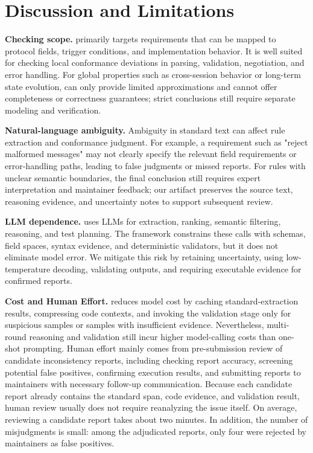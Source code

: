 \section{Discussion and Limitations}
\label{sec:discussion}

\noindent \textbf{Checking scope.}
\tool{} primarily targets requirements that can be mapped to protocol fields,
trigger conditions, and implementation behavior. It is well suited for checking
local conformance deviations in parsing, validation, negotiation, and error
handling. For global properties such as cross-session behavior or long-term
state evolution, \tool{} can only provide limited approximations and cannot
offer completeness or correctness guarantees; strict conclusions still require
separate modeling and verification.

\noindent \textbf{Natural-language ambiguity.}
Ambiguity in standard text can affect rule extraction and conformance
judgment. For example, a requirement such as "reject malformed messages" may
not clearly specify the relevant field requirements or error-handling paths,
leading to false judgments or missed reports. For rules with unclear semantic
boundaries, the final conclusion still requires expert interpretation and
maintainer feedback; our artifact preserves the source text, reasoning
evidence, and uncertainty notes to support subsequent review.

\noindent \textbf{LLM dependence.}
\tool{} uses LLMs for extraction, ranking, semantic filtering, reasoning, and
test planning. The framework constrains these calls with schemas, field spaces,
syntax evidence, and deterministic validators, but it does not eliminate model
error. We mitigate this risk by retaining uncertainty, using low-temperature
decoding, validating outputs, and requiring executable evidence for confirmed 
reports.

\noindent \textbf{Cost and Human Effort.}
\tool{} reduces model cost by caching standard-extraction results,
compressing code contexts, and invoking the validation stage only for
suspicious samples or samples with insufficient evidence. Nevertheless,
multi-round reasoning and validation still incur higher model-calling costs
than one-shot prompting. Human effort mainly comes from pre-submission review
of candidate inconsistency reports, including checking report accuracy,
screening potential false positives, confirming execution results, and
submitting reports to maintainers with necessary follow-up communication.
Because each candidate report already contains the standard span, code
evidence, and validation result, human review usually does not require
reanalyzing the issue itself. On average, reviewing a candidate report takes
about two minutes. In addition, the number of misjudgments is small: among the
adjudicated reports, only four were rejected by maintainers as false positives.


